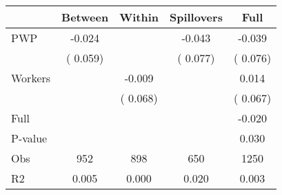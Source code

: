 
\begin{tabular}{l*{4}{c}}\hline&\multicolumn{1}{c}{Between}&\multicolumn{1}{c}{Within}&\multicolumn{1}{c}{Spillovers}&\multicolumn{1}{c}{Full}\\ \hline
 PWP           &             -0.024      &                                               &       -0.043 &        -0.039                            \\ 
                               &        (       0.059)           &                                       &       (       0.077)     &      (       0.076)                                           \\ 
 Workers       &                                               &       -0.009    &                                &             0.014                            \\ 
                               &                                               & (       0.068)                  &                                        &      (       0.067)                                           \\ 
\hline                                                                                                                                                                                                                                            
 Full                  &                                               &                                               &                                        &            -0.020                                     \\ 
 P-value               &                                               &                                               &                                        &             0.030                                           \\ 
 Obs                   &               952               &       898                       &       650                &              1250                                               \\ 
 R2                    &                      0.005              &              0.000                      &              0.020               &                     0.003                                              \\ 
\hline \end{tabular}                                                                                                                                                                                                              